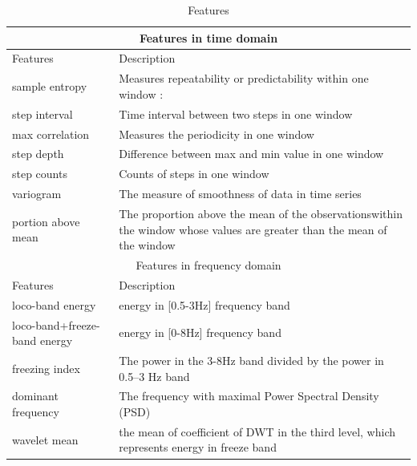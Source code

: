 \documentclass[article]{article}
\begin{document}
\begin{center}
	\begin{table}
	\begin{tabular}{ |p{2cm}||p{6cm}|  }
		\hline
		\multicolumn{2}{|c|}{Features in time domain} \\
		\hline
		Features & Description\\
		\hline
		sample entropy & Measures repeatability or predictability within one window : \\
		\hline
		step interval & Time interval between two steps in one window\\
		\hline
		max correlation & Measures the periodicity in one window\\
		\hline
		step depth & Difference between max and min value in one window\\
		\hline
		step counts & Counts of steps in one window \\
		\hline
		variogram & The measure of smoothness of data in time series \\
		\hline
		portion above mean &The proportion above the mean of the observationswithin the window whose values are greater than
		the mean of the window \\
		
		\hline
		\multicolumn{2}{|c|}{Features in frequency domain}
		\\
		\hline
		Features & Description\\
		\hline
		loco-band energy & energy in [0.5-3Hz] frequency band\\
		\hline
		loco-band+freeze-band energy & energy in [0-8Hz] frequency band \\
		\hline
		freezing index & The power in the 3-8Hz band divided by the power in 0.5–3 Hz band  \\
		\hline
		dominant frequency & The frequency with maximal Power Spectral Density (PSD) \\
		\hline
		wavelet mean & the mean of coefficient of DWT in the third level, which represents energy in freeze band \\
		
		\hline
	\end{tabular}
\caption{Features}
\end{table}
\end{center}
\end{document}

